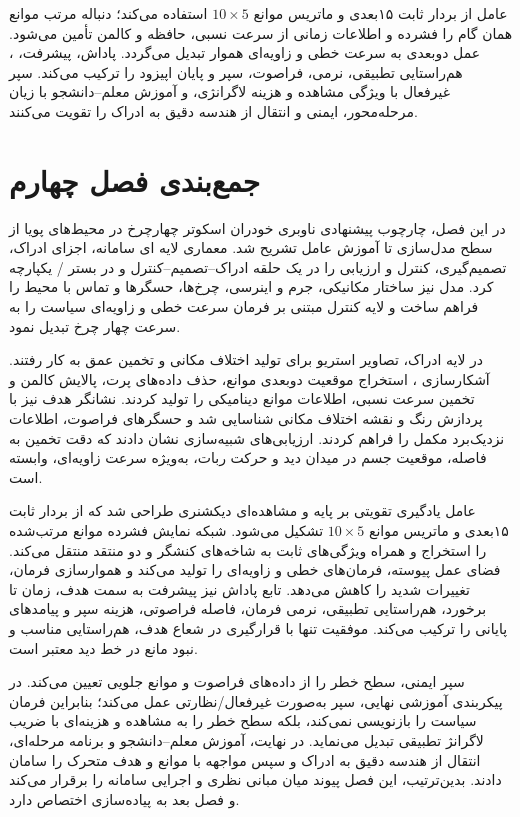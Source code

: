 عامل از بردار ثابت ۱۵بعدی و ماتریس موانع \(10\times5\) استفاده می‌کند؛  دنباله مرتب موانع همان گام را فشرده و اطلاعات زمانی از سرعت نسبی، حافظه و کالمن تأمین می‌شود. عمل دوبعدی به سرعت خطی و زاویه‌ای هموار تبدیل می‌گردد. پاداش، پیشرفت، ، هم‌راستایی تطبیقی، نرمی، فراصوت، سپر و پایان اپیزود را ترکیب می‌کند. سپر غیرفعال با ویژگی مشاهده و هزینه لاگرانژی، و آموزش معلم--دانشجو با زیان مرحله‌محور، ایمنی و انتقال از هندسه دقیق به ادراک را تقویت می‌کنند.

\section{جمع‌بندی فصل چهارم}
\label{sec:chapter4_summary}

در این فصل، چارچوب پیشنهادی ناوبری خودران اسکوتر چهارچرخ در محیط‌های پویا از سطح مدل‌سازی تا آموزش عامل تشریح شد. معماری لایه ای سامانه، اجزای ادراک، تصمیم‌گیری، کنترل و ارزیابی را در یک حلقه ادراک--تصمیم--کنترل و در بستر / یکپارچه کرد. مدل  نیز ساختار مکانیکی، جرم و اینرسی، چرخ‌ها، حسگرها و تماس با محیط را فراهم ساخت و لایه کنترل مبتنی بر  فرمان سرعت خطی و زاویه‌ای سیاست را به سرعت چهار چرخ تبدیل نمود.

در لایه ادراک، تصاویر استریو برای تولید اختلاف مکانی و تخمین عمق به کار رفتند. آشکارسازی ، استخراج موقعیت دوبعدی موانع، حذف داده‌های پرت، پالایش کالمن و تخمین سرعت نسبی، اطلاعات موانع دینامیکی را تولید کردند. نشانگر هدف نیز با پردازش رنگ و نقشه اختلاف مکانی شناسایی شد و حسگرهای فراصوت، اطلاعات نزدیک‌برد مکمل را فراهم کردند. ارزیابی‌های شبیه‌سازی نشان دادند که دقت تخمین به فاصله، موقعیت جسم در میدان دید و حرکت ربات، به‌ویژه سرعت زاویه‌ای، وابسته است.

عامل یادگیری تقویتی بر پایه  و مشاهده‌ای دیکشنری طراحی شد که از بردار ثابت ۱۵بعدی و ماتریس موانع \(10\times5\) تشکیل می‌شود. شبکه  نمایش فشرده موانع مرتب‌شده را استخراج و همراه ویژگی‌های ثابت به شاخه‌های کنشگر و دو منتقد منتقل می‌کند. فضای عمل پیوسته، فرمان‌های خطی و زاویه‌ای را تولید می‌کند و هموارسازی فرمان، تغییرات شدید را کاهش می‌دهد. تابع پاداش نیز پیشرفت به سمت هدف، زمان تا برخورد، هم‌راستایی تطبیقی، نرمی فرمان، فاصله فراصوتی، هزینه سپر و پیامدهای پایانی را ترکیب می‌کند. موفقیت تنها با قرارگیری در شعاع هدف، هم‌راستایی مناسب و نبود مانع در خط دید معتبر است.

سپر ایمنی، سطح خطر را از داده‌های فراصوت و موانع جلویی تعیین می‌کند. در پیکربندی آموزشی نهایی، سپر به‌صورت غیرفعال/نظارتی عمل می‌کند؛ بنابراین فرمان سیاست را بازنویسی نمی‌کند، بلکه سطح خطر را به مشاهده و هزینه‌ای با ضریب لاگرانژ تطبیقی تبدیل می‌نماید. در نهایت، آموزش معلم--دانشجو و برنامه مرحله‌ای، انتقال از هندسه دقیق به ادراک و سپس مواجهه با موانع و هدف متحرک را سامان دادند. بدین‌ترتیب، این فصل پیوند میان مبانی نظری و اجرایی سامانه را برقرار می‌کند و فصل بعد به پیاده‌سازی اختصاص دارد.
